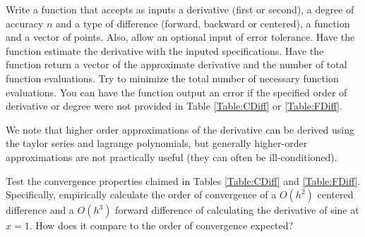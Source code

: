 \begin{problem}
Write a function that accepts as inputs a derivative (first or second), a degree of accuracy $n$ and a type of difference (forward, backward or centered), a function and a vector of points. Also, allow an optional input of error tolerance. Have the function estimate the derivative with the inputed specifications. Have the function return a vector of the approximate derivative and the number of total function evaluations. Try to minimize the total number of necessary function evaluations. You can have the function output an error if the specified order of derivative or degree were not provided in Table \ref{Table:CDiff} or \ref{Table:FDiff}.
\end{problem}

We note that higher order approximations of the derivative can be derived using the taylor series and lagrange polynomials, but generally higher-order approximations are not practically useful (they can often be ill-conditioned).

\begin{problem}
Test the convergence properties claimed in Tables \ref{Table:CDiff} and \ref{Table:FDiff}. Specifically, empirically calculate the order of convergence of a $O(h^2)$ centered difference and a $O(h^3)$ forward difference of calculating the derivative of sine at $x=1$. How does it compare to the order of convergence expected?
\end{problem}
